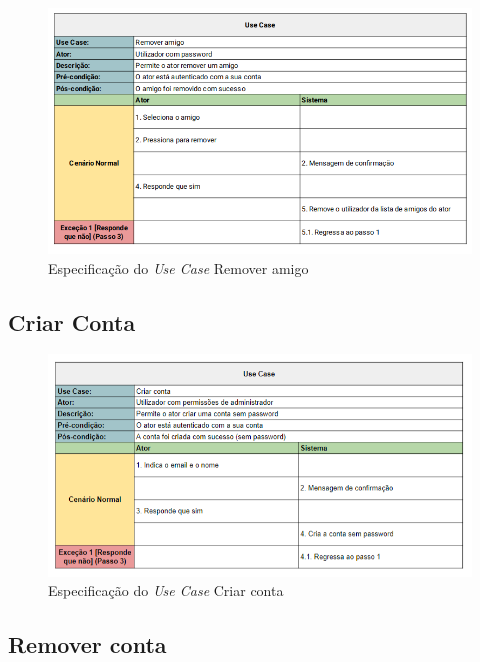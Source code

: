 \documentclass[a4paper]{report}
\begin{document}
\begin{figure}[H]
	\centering 
    \includegraphics[width=\textwidth]{images/Remover_Amigo.png}  
    \caption{Especificação do \emph{Use Case} Remover amigo}
\end{figure}

\subsection{Criar Conta}

\begin{figure}[H]
	\centering 
    \includegraphics[width=\textwidth]{images/Criar_Conta.png}  
    \caption{Especificação do \emph{Use Case} Criar conta}
\end{figure}

\subsection{Remover conta}
\end{document}
